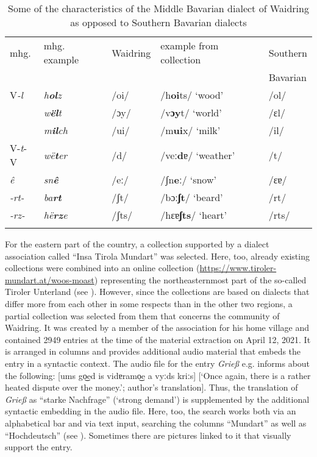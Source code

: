 \documentclass[output=paper]{langscibook}
\begin{document}
\begin{table}
\begin{tabular}{lllll}
\lsptoprule
{mhg.} & {mhg. example} & {Waidring} & {example from collection} & Southern\\
& & & & Bavarian \\
\midrule
{V\textit{{}-l}} & \textit{h}\textbf{\textit{ol}}\textit{z} & /oi/ & /h\textbf{oi}ts/ ‘wood’ & /ol/\\
& \textit{w}\textbf{\textit{ël}}\textit{t}
& /ɔy/& /v\textbf{ɔy}t/ ‘world’ & /ɛl/ \\
& \textit{m}\textbf{\textit{il}}\textit{ch} & /ui/ & /m\textbf{ui}x/ ‘milk’ & /il/\\
\midrule
{ V-\textit{t}{}-V} & \textit{wë}\textbf{\textit{t}}\textit{er} & /d/ & /veː\textbf{d}ɐ/ ‘weather’ & /t/\\
\midrule
\textit{ê} & \textit{sn}\textbf{\textit{ê}} & /eː/ & /ʃn\textbf{eː}/ ‘snow’ & /ɛɐ/\\
\midrule
\textit{{}-rt-} & \textit{ba}\textbf{\textit{rt}} & /ʃt/ & /bɔː\textbf{ʃt}/ ‘beard’ & /rt/ \\
\textit{{}-rz-} & \textit{hë}\textbf{\textit{rz}}\textit{e} & /ʃts/ & /hɛɐ\textbf{ʃts}/ ‘heart’ & /rts/\\
\lspbottomrule
\end{tabular}
\caption{\label{tab:kathrein:3} Some of the characteristics of the Middle Bavarian dialect of Waidring as opposed to Southern Bavarian dialects}
\end{table}

For the eastern part of the country, a collection supported by a dialect association called “Insa Tirola Mundart” was selected. Here, too, already existing collections were combined into an online collection (\url{https://www.tiroler-mundart.at/woos-moast}) representing the northeasternmost part of the so-called Tiroler Unterland (see ). However, since the collections are based on dialects that differ more from each other in some respects than in the other two regions, a partial collection was selected from them that concerns the community of Waidring. It was created by a member of the association for his home village and contained 2949 entries at the time of the material extraction on April 12, 2021. It is arranged in columns and provides additional audio material that embeds the entry in a syntactic context. The audio file for the entry \textit{Grieß} e.g. informs about the following: [ums go͜ed is vidɐramo͜e a vyːds kriːs] [‘Once again, there is a rather heated dispute over the money.’; author’s translation]. Thus, the translation of \textit{Grieß} as “starke Nachfrage” (‘strong demand’) is supplemented by the additional syntactic embedding in the audio file. Here, too, the search works both via an alphabetical bar and via text input, searching the columns “Mundart” as well as “Hochdeutsch” (see ). Sometimes there are pictures linked to it that visually support the entry.
\end{document}
